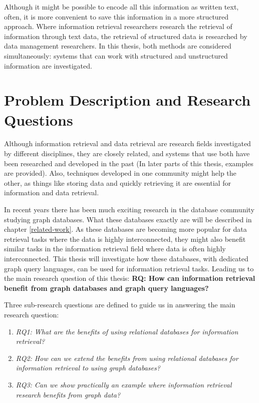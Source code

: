Although it might be possible to encode all this information as written text, often, it is more convenient to save this information in a more structured approach. Where information retrieval researchers research the retrieval of information through text data, the retrieval of structured data is researched by data management researchers. In this thesis, both methods are considered simultaneously: systems that can work with structured and unstructured information are investigated.

\section{Problem Description and Research Questions}
Although information retrieval and data retrieval are research fields investigated by different disciplines, they are closely related, and systems that use both have been researched and developed in the past (In later parts of this thesis, examples are provided). Also, techniques developed in one community might help the other, as things like storing data and quickly retrieving it are essential for information and data retrieval. 

In recent years there has been much exciting research in the database community studying graph databases. What these databases exactly are will be described in chapter \ref{related-work}. As these databases are becoming more popular for data retrieval tasks where the data is highly interconnected, they might also benefit similar tasks in the information retrieval field where data is often highly interconnected. This thesis will investigate how these databases, with dedicated graph query languages, can be used for information retrieval tasks. Leading us to the main research question of this thesis: \textbf{RQ: How can information retrieval benefit from graph databases and graph query languages?}

Three sub-research questions are defined to guide us in answering the main research question:

\begin{enumerate}
	\item \emph{RQ1: What are the benefits of using relational databases for information retrieval?} 
	\item \emph{RQ2: How can we extend the benefits from using relational databases for information retrieval to using graph databases?} 
	\item \emph{RQ3: Can we show practically an example where information retrieval research benefits from graph data?} 
\end{enumerate}

